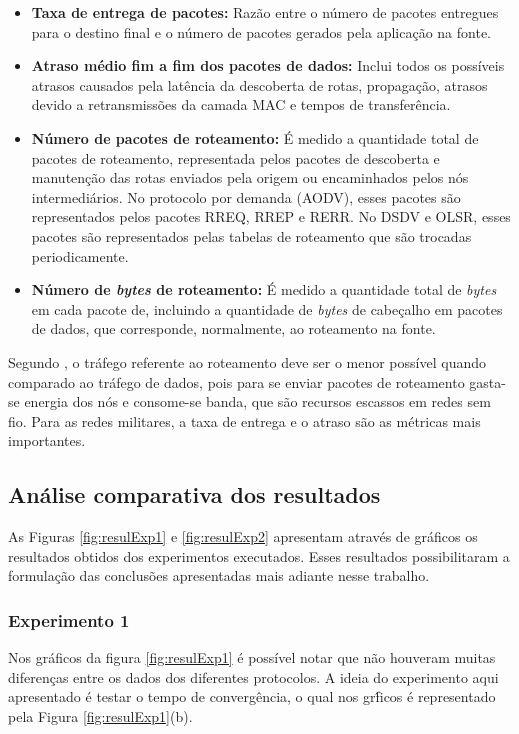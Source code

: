 \begin{itemize}
	\item \textbf{Taxa de entrega de pacotes:} Raz\~ao entre o n\'umero de pacotes entregues para o destino final e o n\'umero de pacotes gerados pela aplica\c{c}\~ao na fonte.
	\item \textbf{Atraso m\'edio fim a fim dos pacotes de dados:} Inclui todos os poss\'iveis atrasos causados pela lat\^encia da descoberta de rotas, propaga\c{c}\~ao, atrasos devido a retransmiss\~oes da camada MAC e tempos de transfer\^encia.
	\item \textbf{N\'umero de pacotes de roteamento:} \'E medido a quantidade total de pacotes de roteamento, representada pelos pacotes de descoberta e manuten\c{c}\~ao das rotas enviados pela origem ou encaminhados pelos n\'os intermedi\'arios. No protocolo por demanda (AODV), esses pacotes s\~ao representados pelos pacotes RREQ, RREP e RERR. No DSDV e OLSR, esses pacotes s\~ao representados pelas tabelas de roteamento que s\~ao trocadas periodicamente.
	\item \textbf{N\'umero de \textit{bytes} de roteamento:} \'E medido a quantidade total de \textit{bytes} em cada pacote de, incluindo a quantidade de \textit{bytes} de cabe\c{c}alho em pacotes de dados, que corresponde, normalmente, ao roteamento na fonte.
\end{itemize}
Segundo \cite{pereira}, o tr\'afego referente ao roteamento deve ser o menor poss\'ivel quando comparado ao tr\'afego de dados, pois para se enviar pacotes de roteamento gasta-se energia dos n\'os e consome-se banda, que s\~ao recursos escassos em redes sem fio. 
Para as redes militares, a taxa de entrega e o atraso s\~ao as m\'etricas mais importantes.

\subsection{An\'alise comparativa dos resultados}
As Figuras \ref{fig:resulExp1} e \ref{fig:resulExp2} apresentam atrav\'es de gr\'aficos os resultados obtidos dos experimentos executados. Esses resultados possibilitaram a formula\c{c}\~ao das conclus\~oes apresentadas mais adiante nesse trabalho.

\subsubsection{Experimento 1}
Nos gr\'aficos da figura \ref{fig:resulExp1} \'e poss\'ivel notar que n\~ao houveram muitas diferen\c{c}as entre os dados dos diferentes protocolos. A ideia do experimento aqui apresentado \'e testar o tempo de converg\^encia, o qual nos gr\'ficos \'e representado pela Figura \ref{fig:resulExp1}(b).

